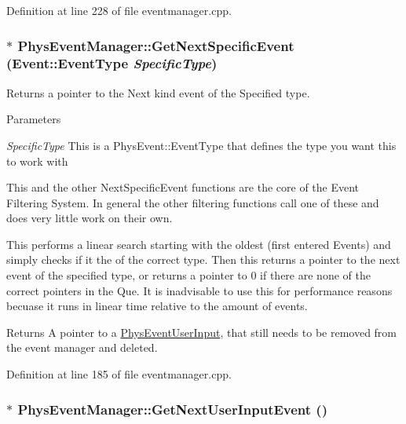 Definition at line 228 of file eventmanager.cpp.

\hypertarget{classPhysEventManager_abf1dd378082dde44e9bcebc900f7edf6}{
\subsubsection[{GetNextSpecificEvent}]{ $\ast$ PhysEventManager::GetNextSpecificEvent ({\bf Event::EventType} {\em SpecificType})}}
\label{d5/dd7/classPhysEventManager_abf1dd378082dde44e9bcebc900f7edf6}


Returns a pointer to the Next kind event of the Specified type. 


\begin{DoxyParams}{Parameters}
\item[{\em SpecificType}]This is a PhysEvent::EventType that defines the type you want this to work with\end{DoxyParams}
This and the other NextSpecificEvent functions are the core of the Event Filtering System. In general the other filtering functions call one of these and does very little work on their own. \par
 This performs a linear search starting with the oldest (first entered Events) and simply checks if it the of the correct type. Then this returns a pointer to the next event of the specified type, or returns a pointer to 0 if there are none of the correct pointers in the Que. It is inadvisable to use this for performance reasons becuase it runs in linear time relative to the amount of events. \begin{DoxyReturn}{Returns}
A pointer to a \hyperlink{classPhysEventUserInput}{PhysEventUserInput}, that still needs to be removed from the event manager and deleted. 
\end{DoxyReturn}


Definition at line 185 of file eventmanager.cpp.

\hypertarget{classPhysEventManager_a4874a9b1138d2351bf28e527a66c02b8}{
\subsubsection[{GetNextUserInputEvent}]{ $\ast$ PhysEventManager::GetNextUserInputEvent ()}}
\label{d5/dd7/classPhysEventManager_a4874a9b1138d2351bf28e527a66c02b8}


